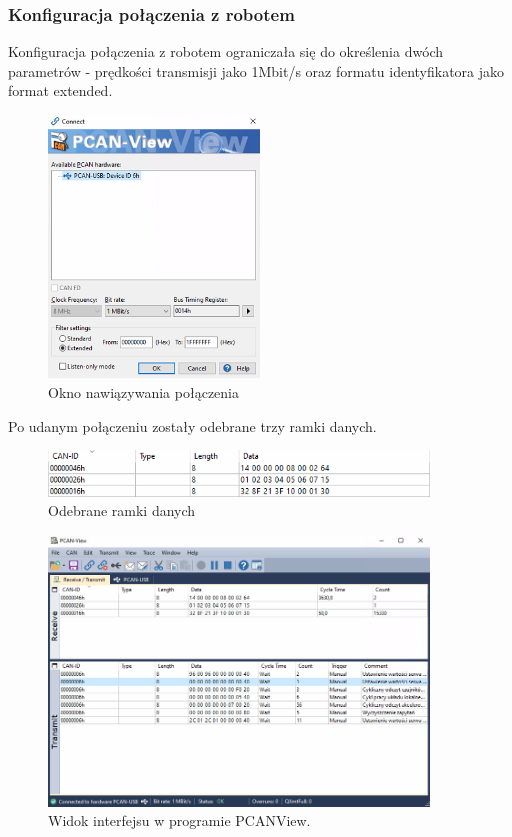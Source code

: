 \documentclass[margin = 2cm]{article}
\begin{document}
	\subsubsection{Konfiguracja połączenia z robotem}
	Konfiguracja połączenia z robotem ograniczała się do określenia dwóch parametrów - prędkości transmisji jako 1Mbit/s oraz formatu identyfikatora jako format extended.
	\begin{figure}[H]
		\centering
		\includegraphics[width=0.5\textwidth]{0}
		\caption{Okno nawiązywania połączenia}
	\end{figure}
	Po udanym połączeniu zostały odebrane trzy ramki danych.
	\begin{figure}[H]
		\centering
		\includegraphics[width=0.9\textwidth]{0_1}
		\caption{Odebrane ramki danych}
	\end{figure}
	\begin{figure}[H]
		\centering
		\includegraphics[width=0.9\textwidth]{interfejs}
		\caption{Widok interfejsu w programie PCANView.}
	\end{figure}
\end{document}
